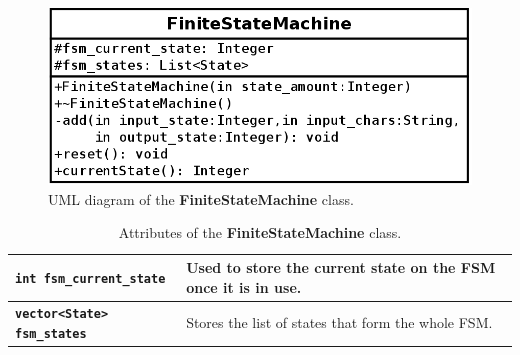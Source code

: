 \documentclass[11pt,twoside,openany,x11names,svgnames]{memoir}
\begin{document}
\begin{figure}
	\centering
	\includegraphics[scale=0.4, clip=true, trim= 0pt 0pt 0pt 0pt]{images/chapter03-image10}
	\caption{UML diagram of the \textbf{FiniteStateMachine} class.}
	\label{fig:class-fsm}
\end{figure}

\begin{table}[h]\footnotesize
\centering
\begin{tabular}{| >{\bfseries}p{4cm} | p{11.5cm} |}
	\hline
	
	\texttt{int fsm\_current\_state} & Used to store the current state on the FSM once it is in use. \\
	
	\hline
	
	\texttt{vector<State> fsm\_states} & Stores the list of states that form the whole FSM. \\
	
	\hline
\end{tabular}
\caption{Attributes of the \textbf{FiniteStateMachine} class.}
\label{tab:FiniteStateMachine-Attributes}
\end{table}
\end{document}
